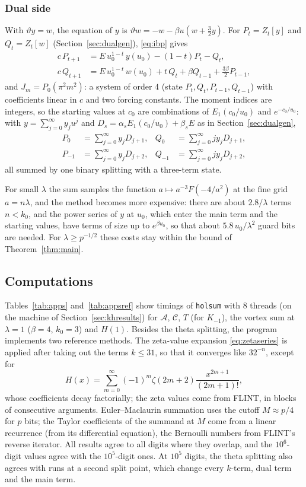 \documentclass[11pt]{amsart}
\theoremstyle{definition}
\theoremstyle{remark}
\begin{document}
\subsubsection{Dual side} With $\vartheta y = w$, the equation of $y$ is $\vartheta w = -w - \beta u(w + \frac32 y)$. For
$P_t = Z_t[y]$ and $Q_t = Z_t[w]$ (Section~\ref{sec:dualgen}), \eqref{eq:ibp} gives
\begin{align*}
  c\,P_{t+1} &= E\,u_0^{1-t}\,y(u_0) - (1-t)P_t - Q_t, \\
  c\,Q_{t+1} &= E\,u_0^{1-t}\,w(u_0) + t\,Q_t + \beta Q_{t-1} + \tfrac{3\beta}{2}P_{t-1},
\end{align*}
and $J_m = P_0(\pi^2m^2)$: a system of order $4$ (state $P_t, Q_t, P_{t-1}, Q_{t-1}$) with coefficients linear in $c$ and
two forcing constants. The moment indices are integers, so the starting values at $c_0$ are combinations of
$E_1(c_0/u_0)$ and $e^{-c_0/u_0}$: with $y = \sum_{j=0}^{\infty}y_ju^j$ and $D_s = \alpha_sE_1(c_0/u_0) + \beta_sE$ as in
Section~\ref{sec:dualgen},
\begin{align*}
  P_0 &= \sum_{j=0}^{\infty}y_jD_{j+1}, & Q_0 &= \sum_{j=0}^{\infty} jy_jD_{j+1}, \\
  P_{-1} &= \sum_{j=0}^{\infty}y_jD_{j+2}, & Q_{-1} &= \sum_{j=0}^{\infty}jy_jD_{j+2},
\end{align*}
all summed by one binary splitting with a three-term state.

For small $\lambda$ the sum samples the function $a \mapsto a^{-3}F(-4/a^2)$ at the fine grid $a = n\lambda$, and the method
becomes more expensive: there are about $2.8/\lambda$ terms $n < k_0$, and the power series of $y$ at $u_0$, which
enter the main term and the starting values, have terms of size up to $e^{\beta u_0}$, so that about $5.8\,u_0/\lambda^2$ guard
bits are needed. For $\lambda \ge p^{-1/2}$ these costs stay within the bound of Theorem~\ref{thm:main}.

\subsection{Computations}\label{sec:appcomp}
Tables~\ref{tab:apps} and~\ref{tab:appsref} show timings of \texttt{holsum} with $8$ threads (on the machine of
Section~\ref{sec:khresults}) for $\mathcal A$, $\mathcal C$, $T$ (for $K_{-1}$), the vortex sum at $\lambda = 1$
($\beta = 4$, $k_0 = 3$) and $H(1)$. Besides the theta splitting, the program implements two reference methods. The
zeta-value expansion \eqref{eq:zetaseries} is applied after taking out the terms $k \le 31$, so that it converges
like $32^{-n}$, except for
\[
  H(x) = \sum_{m=0}^{\infty}(-1)^m\zeta(2m+2)\frac{x^{2m+1}}{(2m+1)!},
\]
whose coefficients decay factorially; the zeta values come from FLINT, in blocks of consecutive arguments. Euler--Maclaurin summation uses the
cutoff $M \approx p/4$ for $p$ bits; the Taylor coefficients of the summand at $M$ come from a linear recurrence (from
its differential equation), the Bernoulli numbers from FLINT's reverse iterator. All results agree to all digits
where they overlap, and the $10^6$-digit values agree with the $10^5$-digit ones. At $10^5$ digits, the theta
splitting also agrees with runs at a second split point, which change every $k$-term, dual term and the main term.
\end{document}
